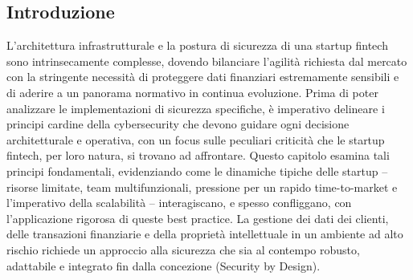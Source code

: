 \subsection{Introduzione}
L'architettura infrastrutturale e la postura di sicurezza di una startup fintech sono intrinsecamente complesse, dovendo bilanciare l'agilità richiesta dal mercato con la stringente necessità di proteggere dati finanziari estremamente sensibili e di aderire a un panorama normativo in continua evoluzione. Prima di poter analizzare le implementazioni di sicurezza specifiche, è imperativo delineare i principi cardine della cybersecurity che devono guidare ogni decisione architetturale e operativa, con un focus sulle peculiari criticità che le startup fintech, per loro natura, si trovano ad affrontare. Questo capitolo esamina tali principi fondamentali, evidenziando come le dinamiche tipiche delle startup – risorse limitate, team multifunzionali, pressione per un rapido time-to-market e l'imperativo della scalabilità – interagiscano, e spesso confliggano, con l'applicazione rigorosa di queste best practice. La gestione dei dati dei clienti, delle transazioni finanziarie e della proprietà intellettuale in un ambiente ad alto rischio richiede un approccio alla sicurezza che sia al contempo robusto, adattabile e integrato fin dalla concezione (Security by Design).
